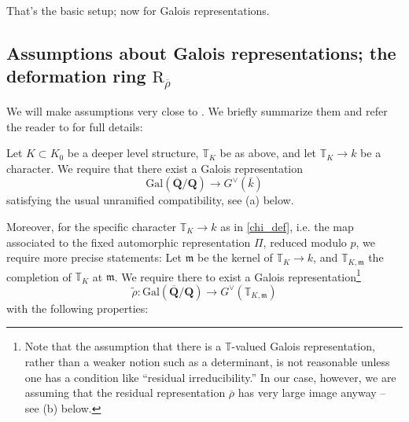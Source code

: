 \documentclass[10pt]{amsart}
\newcommand{\changecolor}{black}
\newcommand{\defring}{\mathrm{R}_{\rhobar}}
\newcommand{\rhobar}{\overline{\rho}}
\newcommand{\Q}{\mathbf{Q}}
\theoremstyle{remark}
\begin{document}
That's the basic setup; now 
for Galois representations. 

\subsection{Assumptions about Galois representations; the deformation ring $\defring$ } \label{GaloisAss}
 We will make assumptions very close to \cite[Conjecture 6.1]{GV}.
 We briefly summarize them and refer the reader to  \cite{GV} for full details:
 

Let $K \subset K_0$ be a deeper level structure, $\mathbb{T}_K$ be as above, and let $\mathbb{T}_K \rightarrow k$
be a character. {\color{\changecolor} We require that there exist a   Galois representation
$$\mathrm{Gal}(\overline{\Q}/\Q) \rightarrow G^{\vee}(\bar{k})$$
satisfying the usual unramified compatibility, see (a) below.  }

Moreover, for the specific character $\mathbb{T}_K \rightarrow k$ 
  as 
in  \eqref{chi_def}, i.e. 
the map associated to  the fixed automorphic representation $\Pi$,
reduced modulo $p$, we require more precise statements:
Let $\mathfrak{m}$ be the kernel of $\mathbb{T}_K \rightarrow k$, and $\mathbb{T}_{K,\mathfrak{m}}$ the completion of $\mathbb{T}_K$ at $\mathfrak{m}$. 
We require there to exist a Galois representation\footnote{Note that the assumption that there is a $\mathbb{T}$-valued Galois representation,
rather than a weaker notion such as a determinant, is not reasonable unless one has a condition like ``residual irreducibility.'' In our case, however, we are assuming that
the residual representation $\rhobar$ has very large image anyway -- see (b) below.} 
$$ \tilde{\rho}: \mathrm{Gal}(\overline{\Q}/\Q) \longrightarrow   G^{\vee}(\mathbb{T}_{K, \mathfrak{m}})$$
 with the following properties: 
\end{document}
